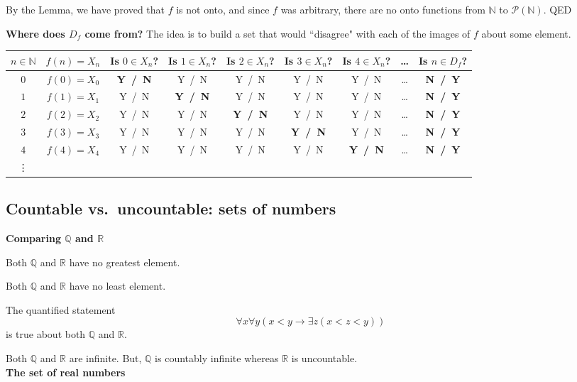 \documentclass[12pt, oneside]{article}
\begin{document}
\vspace{50pt}

By  the Lemma, we  have proved that $f$ is not onto, and since $f$ was arbitrary, there are no onto
functions from $\mathbb{N}$ to $\mathcal{P}(\mathbb{N})$. QED


{\bf Where does $D_f$ come from?} The idea is to build a set that would ``disagree" with 
each of the images of $f$ about some element. 

\begin{center}
\begin{tabular}{c|c|ccccccc}
$n \in \mathbb{N}$ & $f(n) = X_n$ &  Is $0   \in X_n$?   & Is $1 \in X_n$?  &  Is $2 \in X_n$?  &  Is $3 \in X_n$?  &
 Is $4 \in X_n$?  &  \ldots & Is $n \in D_f$?\\
\hline
$0$ & $f(0) = X_0$ & {\bf  Y~/~N}  & Y~/~N & Y~/~N & Y~/~N &Y~/~N & \ldots & {\bf  N~/~Y }\\
$1$ & $f(1) = X_1$ & Y~/~N  & {\bf  Y~/~N} & Y~/~N & Y~/~N & Y~/~N & \ldots & {\bf  N~/~Y }\\
$2$ & $f(2) = X_2$ & Y~/~N  & Y~/~N & {\bf  Y~/~N} & Y~/~N &Y~/~N & \ldots & {\bf  N~/~Y }\\
$3$ & $f(3) = X_3$ & Y~/~N  & Y~/~N & Y~/~N & {\bf  Y~/~N} & Y~/~N & \ldots & {\bf  N~/~Y }\\
$4$ & $f(4) = X_4$ & Y~/~N  & Y~/~N & Y~/~N & Y~/~N &{\bf  Y~/~N} & \ldots & {\bf  N~/~Y }\\
\vdots
\end{tabular}
\end{center} \newpage
\subsection*{Countable vs.\ uncountable: sets of numbers}


{\bf Comparing $\mathbb{Q}$ and $\mathbb{R}$} 


Both $\mathbb{Q}$ and $\mathbb{R}$ have no greatest element.

Both $\mathbb{Q}$ and $\mathbb{R}$ have no least element.

The quantified statement 
\[
    \forall x \forall y (x < y \to \exists z ( x < z < y) )
\]
is true about both $\mathbb{Q}$ and $\mathbb{R}$.

Both $\mathbb{Q}$ and $\mathbb{R}$ are infinite. But, $\mathbb{Q}$ is countably infinite
whereas $\mathbb{R}$ is uncountable.\\


{\bf The set of real numbers}
\end{document}
